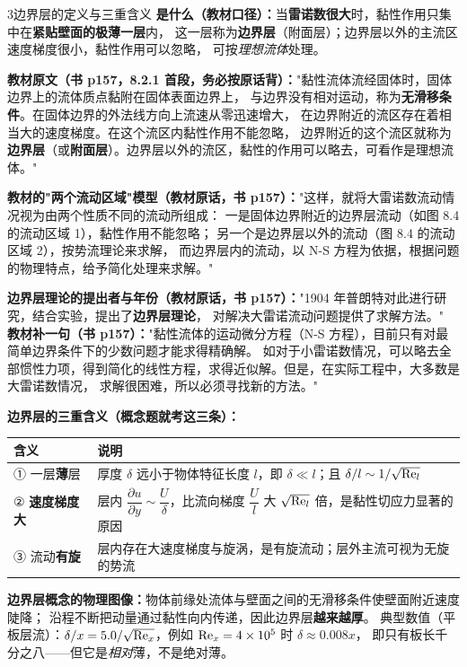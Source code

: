 \begin{kaodian}{3}{边界层的定义与三重含义}
\textbf{是什么（教材口径）：}当\textbf{雷诺数很大}时，黏性作用只集中在\textbf{紧贴壁面的极薄一层}内，
这一层称为\textbf{边界层}（附面层）；边界层以外的主流区速度梯度很小，黏性作用可以忽略，
可按\emph{理想流体}处理。

\textbf{教材原文（书 p157，8.2.1 首段，务必按原话背）：}"黏性流体流经固体时，固体边界上的流体质点黏附在固体表面边界上，
与边界没有相对运动，称为\textbf{无滑移条件}。在固体边界的外法线方向上流速从零迅速增大，
在边界附近的流区存在着相当大的速度梯度。在这个流区内黏性作用不能忽略，
边界附近的这个流区就称为\textbf{边界层}（或\textbf{附面层}）。边界层以外的流区，黏性的作用可以略去，可看作是理想流体。"

\textbf{教材的"两个流动区域"模型（教材原话，书 p157）：}"这样，就将大雷诺数流动情况视为由两个性质不同的流动所组成：
一是固体边界附近的边界层流动（如图 8.4 的流动区域 1），黏性作用不能忽略；
另一个是边界层以外的流动（图 8.4 的流动区域 2），按势流理论来求解，
而边界层内的流动，以 N-S 方程为依据，根据问题的物理特点，给予简化处理来求解。"

\textbf{边界层理论的提出者与年份（教材原话，书 p157）：}"1904 年普朗特对此进行研究，结合实验，提出了\textbf{边界层理论}，
对解决大雷诺流动问题提供了求解方法。"
\textbf{教材补一句（书 p157）：}"黏性流体的运动微分方程（N-S 方程），目前只有对最简单边界条件下的少数问题才能求得精确解。
如对于小雷诺数情况，可以略去全部惯性力项，得到简化的线性方程，求得近似解。但是，在实际工程中，大多数是大雷诺数情况，
求解很困难，所以必须寻找新的方法。"

\textbf{边界层的三重含义（概念题就考这三条）：}
\begin{center}
\begin{tabularx}{\textwidth}{@{}lX@{}}
\toprule
含义 & 说明 \\
\midrule
① 一层\textbf{薄}层 & 厚度 $\delta$ 远小于物体特征长度 $l$，即 $\delta\ll l$；且 $\delta/l\sim 1/\sqrt{\mathrm{Re}_l}$ \\
② \textbf{速度梯度大} & 层内 $\dfrac{\partial u}{\partial y}\sim\dfrac{U}{\delta}$，比流向梯度 $\dfrac{U}{l}$ 大 $\sqrt{\mathrm{Re}_l}$ 倍，是黏性切应力显著的原因 \\
③ 流动\textbf{有旋} & 层内存在大速度梯度与旋涡，是有旋流动；层外主流可视为无旋的势流 \\
\bottomrule
\end{tabularx}
\end{center}

\textbf{边界层概念的物理图像：}物体前缘处流体与壁面之间的无滑移条件使壁面附近速度陡降；
沿程不断把动量通过黏性向内传递，因此边界层\textbf{越来越厚}。
典型数值（平板层流）：$\delta/x=5.0/\sqrt{\mathrm{Re}_x}$，例如 $\mathrm{Re}_x=4\times10^5$ 时 $\delta\approx0.008x$，
即只有板长千分之八——但它是\emph{相对}薄，不是绝对薄。


\end{kaodian}
